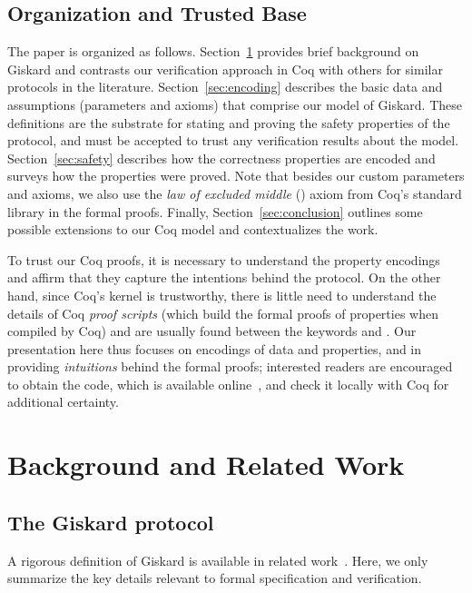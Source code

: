 \documentclass{easychair}
\begin{document}
\subsection{Organization and Trusted Base}
The paper is organized as follows. Section~\ref{sec:background} provides brief background on Giskard and contrasts our verification approach in Coq with others for similar protocols in the literature.
%
Section~\ref{sec:encoding} describes the basic data and assumptions (parameters and axioms) that comprise our model of Giskard. These definitions are the substrate for stating and proving the safety properties of the protocol, and must be accepted to trust any verification results about the model. Section~\ref{sec:safety} describes how the correctness properties are encoded and surveys how the properties were proved. Note that besides our custom parameters and axioms, we also use the \emph{law of excluded middle} () axiom from Coq's standard library in the formal proofs. Finally, Section~\ref{sec:conclusion} outlines some possible extensions to our Coq model and contextualizes the work.

To trust our Coq proofs, it is necessary to understand the property encodings and affirm that they capture the intentions behind the protocol. On the other hand, since Coq's kernel is trustworthy, there is little need to understand the details of Coq \emph{proof scripts} (which build the formal proofs of properties when compiled by Coq) and are usually found between the keywords  and . Our presentation here thus focuses on encodings of data and properties, and in providing \emph{intuitions} behind the formal proofs; interested readers are encouraged to obtain the code, which is available online~\cite{CoqGiskard}, and check it locally with Coq for additional certainty.

\section{Background and Related Work}
\label{sec:background}
\subsection{The Giskard protocol}
\label{sec:proto-overview}
A rigorous definition of Giskard is available in related work~\cite{GiskardSpec}. Here, we only summarize the key details relevant to formal specification and verification.
\end{document}

